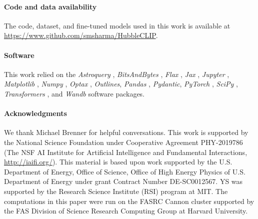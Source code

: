 \documentclass[10pt]{article} %
\newcommand{\package}[1]{\textsl{#1}\xspace}
\begin{document}


\paragraph*{Code and data availability}

The code, dataset, and fine-tuned models used in this work is available at \url{https://www.github.com/smsharma/HubbleCLIP}.

\paragraph*{Software}

This work relied on the \package{Astroquery} \citep{2019AJ....157...98G}, \package{BitsAndBytes} \citep{dettmers2022llmint8}, \package{Flax} \citep{flax2020github}, \package{Jax} \citep{jax2018github}, \package{Jupyter} \citep{Kluyver2016jupyter}, \package{Matplotlib} \citep{Hunter:2007}, \package{Numpy} \citep{harris2020array}, \package{Optax} \citep{deepmind2020jax}, \package{Outlines}, \package{Pandas} \citep{2020SciPy-NMeth}, \package{Pydantic}, \package{PyTorch} \citep{paszke2019pytorch}, \package{SciPy} \citep{2020SciPy-NMeth}, \package{Transformers} \citep{wolf2019huggingface}, and \package{Wandb} \citep{wandb} software packages.



\paragraph*{Acknowledgments}

We thank Michael Brenner for helpful conversations. This work is supported by the National Science Foundation under Cooperative Agreement PHY-2019786 (The NSF AI Institute for Artificial Intelligence and Fundamental Interactions, \url{http://iaifi.org/}). This material is based upon work supported by the U.S. Department of Energy, Office of Science, Office of High Energy Physics of U.S. Department of Energy under grant Contract Number  DE-SC0012567. YS was supported by the Research Science Institute (RSI) program at MIT. The computations in this paper were run on the FASRC Cannon cluster supported by the FAS Division of Science Research Computing Group at Harvard University.
\end{document}
